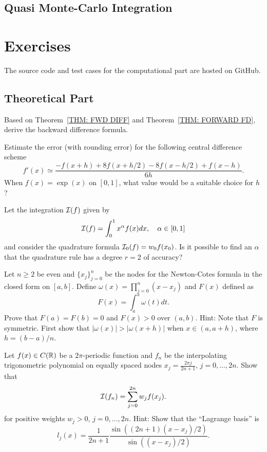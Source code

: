 \subsection{Quasi Monte-Carlo Integration}
\section{Exercises}
The source code and test cases for the computational part are hosted on GitHub.

\subsection{Theoretical Part}
\begin{problem}
\label{Prb: 3-Bac-Dif}
    Based on Theorem~\ref{THM: FWD DIFF} and Theorem~\ref{THM: FORWARD FD}, derive the backward difference formula.
\end{problem}
\begin{problem}
    Estimate the error (with rounding error) for the following central difference scheme
    $$f'(x)\simeq \frac{-f(x + h) + 8f(x + h/2) - 8 f(x - h/2) + f(x - h)}{6h}.$$
    When $f(x)=\exp(x)$ on $[0, 1]$, what value would be a suitable choice for $h$?
\end{problem}
\begin{problem}
    Let the integration $\mathcal I(f)$ given by
    $$\mathcal I(f) = \int_0^1 x^{\alpha} f(x) dx,\quad \alpha\in [0, 1]$$
    and consider the quadrature formula $\mathcal I_0(f) = w_0 f(x_0)$. Is it possible to find an $\alpha$ that the quadrature rule has a degree $r= 2$ of accuracy?
\end{problem}
\begin{problem}
\label{Prb: 3-Exe-4}
    Let $n\ge 2$ be even and $\{ x_j\}_{j=0}^n$ be the nodes for the Newton-Cotes formula in the closed form on $[a, b]$. Define $\omega(x)=\prod_{j=0}^n (x - x_j)$ and $F(x)$ defined as 
    $$F(x) = \int_a^x \omega(t)dt.$$
    Prove that $F(a) = F(b) = 0$ and $F(x) > 0$ over $(a ,b)$. 
    Hint: Note that $F$ is symmetric. First show that $|\omega(x)| > |\omega(x + h)|$ when $x\in (a, a + h)$, where $h = (b-a)/n$.
\end{problem}
\begin{problem}
    Let $f(x)\in C(\mathbb R)$ be a $2\pi$-periodic function and $f_n$ be the interpolating trigonometric polynomial on equally spaced nodes $x_j = \frac{2\pi j}{2n+1}$, $j=0,\dots, 2n$. Show that 
    \begin{equation}
       \mathcal I(f_n) = \sum_{j=0}^{2n} w_j f(x_j).
    \end{equation}
    for positive weights $w_j > 0$, $j = 0,\dots, 2n$.
    Hint: Show that the ``Lagrange basis'' is $$l_j(x) =\frac{1}{2n+1} \frac{\sin((2n+1)(x- x_j)/2)}{\sin((x-x_j)/2)}.$$
\end{problem}
